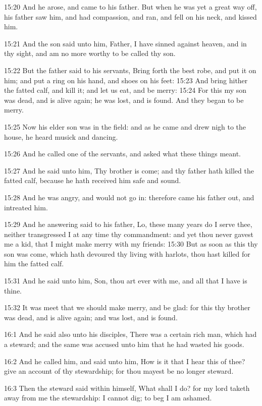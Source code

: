 15:20 And he arose, and came to his father. But when he was yet a great way off, his father saw him, and had compassion, and ran, and fell on his neck, and kissed him.

15:21 And the son said unto him, Father, I have sinned against heaven, and in thy sight, and am no more worthy to be called thy son.

15:22 But the father said to his servants, Bring forth the best robe, and put it on him; and put a ring on his hand, and shoes on his feet: 15:23 And bring hither the fatted calf, and kill it; and let us eat, and be merry: 15:24 For this my son was dead, and is alive again; he was lost, and is found. And they began to be merry.

15:25 Now his elder son was in the field: and as he came and drew nigh to the house, he heard musick and dancing.

15:26 And he called one of the servants, and asked what these things meant.

15:27 And he said unto him, Thy brother is come; and thy father hath killed the fatted calf, because he hath received him safe and sound.

15:28 And he was angry, and would not go in: therefore came his father out, and intreated him.

15:29 And he answering said to his father, Lo, these many years do I serve thee, neither transgressed I at any time thy commandment: and yet thou never gavest me a kid, that I might make merry with my friends: 15:30 But as soon as this thy son was come, which hath devoured thy living with harlots, thou hast killed for him the fatted calf.

15:31 And he said unto him, Son, thou art ever with me, and all that I have is thine.

15:32 It was meet that we should make merry, and be glad: for this thy brother was dead, and is alive again; and was lost, and is found.

16:1 And he said also unto his disciples, There was a certain rich man, which had a steward; and the same was accused unto him that he had wasted his goods.

16:2 And he called him, and said unto him, How is it that I hear this of thee? give an account of thy stewardship; for thou mayest be no longer steward.

16:3 Then the steward said within himself, What shall I do? for my lord taketh away from me the stewardship: I cannot dig; to beg I am ashamed.

